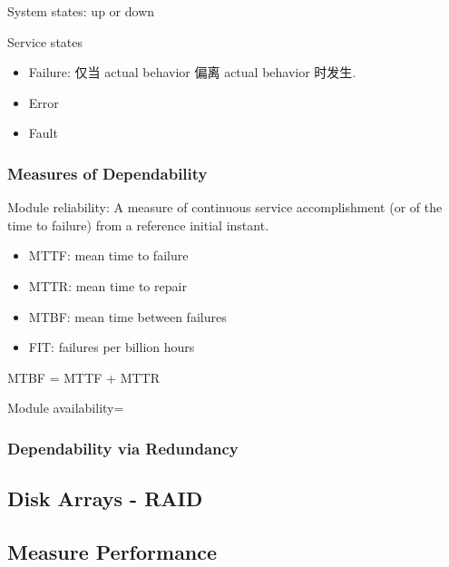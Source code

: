 System states: up or down

Service states %

\begin{itemize}%
    \item Failure: 仅当 actual behavior 偏离 actual behavior 时发生. 
    \item Error
    \item Fault
\end{itemize}

\subsubsection{Measures of Dependability}
Module reliability: A measure of continuous service accomplishment (or of the time to failure) from a reference initial instant. 

\begin{itemize}%
    \item MTTF: mean time to failure
    \item MTTR: mean time to repair
    \item MTBF: mean time between failures
    \item FIT: failures per billion hours
\end{itemize}
MTBF = MTTF + MTTR


Module availability=%

\subsubsection{Dependability via Redundancy}


\subsection{Disk Arrays - RAID}

\subsection{Measure Performance}




